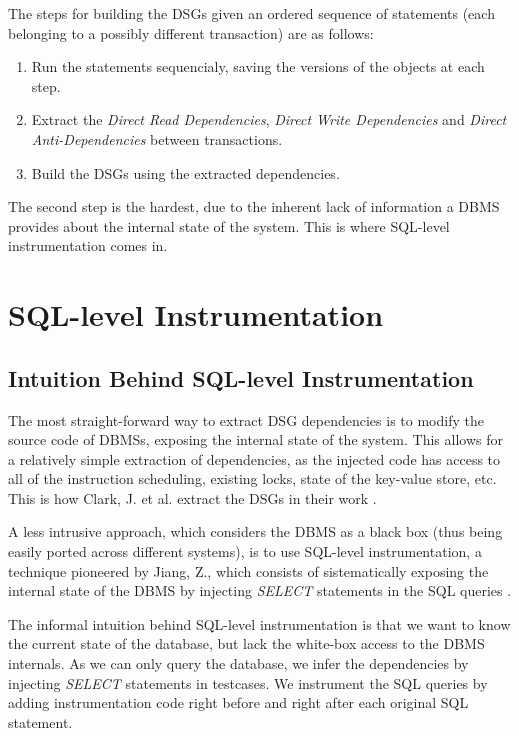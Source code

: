 The steps for building the DSGs given an ordered sequence of statements (each belonging to a possibly different transaction) are as follows:
\begin{enumerate}
    \item Run the statements sequencialy, saving the versions of the objects at each step.
    \item Extract the \textit{Direct Read Dependencies}, \textit{Direct Write Dependencies} and \textit{Direct Anti-Dependencies} between transactions.
    \item Build the DSGs using the extracted dependencies.
\end{enumerate}

The second step is the hardest, due to the inherent lack of information a DBMS provides about the internal state of the system. This is where SQL-level instrumentation comes in.

\section{SQL-level Instrumentation}

\subsection{Intuition Behind SQL-level Instrumentation}

The most straight-forward way to extract DSG dependencies is to modify the source code of DBMSs, exposing the internal state of the system. This allows for a relatively simple extraction of dependencies, as the injected code has access to all of the instruction scheduling, existing locks, state of the key-value store, etc. This is how Clark, J. et al. extract the DSGs in their work \cite{clark2024validating}.

A less intrusive approach, which considers the DBMS as a black box (thus being easily ported across different systems), is to use SQL-level instrumentation, a technique pioneered by Jiang, Z., which consists of sistematically exposing the internal state of the DBMS by injecting \textit{SELECT} statements in the SQL queries \cite{jiang2023detecting}.

The informal intuition behind SQL-level instrumentation is that we want to know the current state of the database, but lack the white-box access to the DBMS internals. As we can only query the database, we infer the dependencies by injecting \textit{SELECT} statements in testcases. We instrument the SQL queries by adding instrumentation code right before and right after each original SQL statement.

